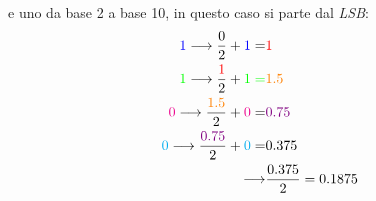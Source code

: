 \documentclass[../main.tex]{subfiles}
\begin{document}
e uno da base 2 a base 10, in questo caso si parte dal \textit{LSB}:
\begin{align*}
    \color{blue}1\color{black} \longrightarrow \frac{0}{2} + \color{blue}1\color{black} =& \color{red}1\\
    \color{green}1\color{black} \longrightarrow \frac{\color{red}1\color{black}}{2} + \color{green}1\color{green} =& \color{orange}1.5\color{black}\\
    \color{magenta}0\color{black} \longrightarrow \frac{\color{orange}1.5\color{black}}{2} + \color{magenta}0\color{black} =& \color{violet}0.75\color{black}\\
    \color{cyan}0\color{black} \longrightarrow \frac{\color{violet}0.75\color{black}}{2} + \color{cyan}0\color{black} =& 0.375\\
    \longrightarrow& \frac{0.375}{2} = 0.1875\\
\end{align*}
\end{document}

